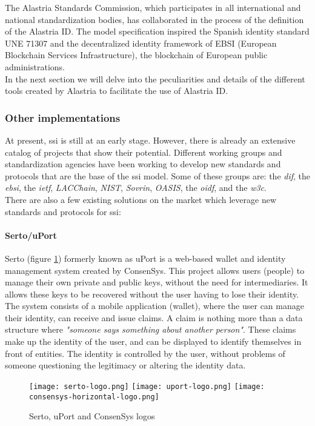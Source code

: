 The Alastria Standards Commission, which participates in all international and national standardization bodies, has collaborated in the process of the definition of the Alastria ID. The model specification inspired the Spanish identity standard UNE 71307\cite{une-71307} and the decentralized identity framework of EBSI\cite{ebsi} (European Blockchain Services Infrastructure), the blockchain of European public administrations.\\

In the next section we will delve into the peculiarities and details of the different tools created by Alastria to facilitate the use of Alastria ID.

\subsubsection{Other implementations}
At present, \acrlong{ssi} is still at an early stage. However, there is already an extensive catalog of projects that show their potential. Different working groups and standardization agencies have been working to develop new standards and protocols that are the base of the \acrshort{ssi} model\cite{ssi-wallets}. Some of these groups are: the \textit{\acrfull{dif}}, the \textit{\acrfull{ebsi}}, the \textit{\acrfull{ietf}}, \textit{LACChain}, \textit{NIST}, \textit{Sovrin}, \textit{OASIS}, the \textit{\acrfull{oidf}}, and the \textit{\acrfull{w3c}}.\\

There are also a few existing solutions on the market which leverage new standards and protocols for \acrshort{ssi}:
\paragraph{Serto/uPort}
Serto\cite{serto} (figure \ref{fig:uport}) formerly known as uPort\cite{uport} is a web-based wallet and identity management system created by ConsenSys\cite{consenSys}. This project allows users (people) to manage their own private and public keys, without the need for intermediaries. It allows these keys to be recovered without the user having to lose their identity. The system consists of a mobile application (wallet), where the user can manage their identity, can receive and issue claims. A claim is nothing more than a data structure where \textit{"someone says something about another person"}. These claims make up the identity of the user, and can be displayed to identify themselves in front of entities. The identity is controlled by the user, without problems of someone questioning the legitimacy or altering the identity data.
\begin{figure}[h]
    \centering
    \texttt{[image: serto-logo.png]}\hfill
    \texttt{[image: uport-logo.png]}\hfill
    \texttt{[image: consensys-horizontal-logo.png]}
    \caption{Serto, uPort and ConsenSys logos}
    \label{fig:uport}
\end{figure}

